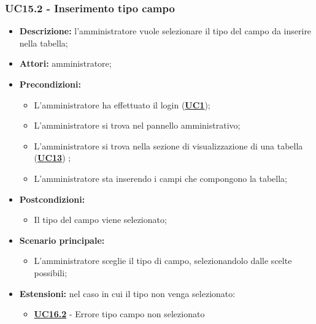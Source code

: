 \subsubsection{UC15.2 - Inserimento tipo campo}
\label{sec:UC15.2}
\begin{itemize}
	\item \textbf{Descrizione:} l’amministratore vuole selezionare il tipo del campo da inserire nella tabella;
	\item \textbf{Attori:} amministratore;
	\item \textbf{Precondizioni:} 
	\begin{itemize}
		\item L’amministratore ha effettuato il login (\hyperref[sec:UC1]{\textbf{UC1}});
		\item L’amministratore si trova nel pannello amministrativo;
		\item L’amministratore si trova nella sezione di visualizzazione di una tabella (\hyperref[sec:UC13]{\textbf{UC13}}) ;
		\item L’amministratore sta inserendo i campi che compongono la tabella;
	\end{itemize}
	\item \textbf{Postcondizioni:} 
	\begin{itemize}
		\item Il tipo del campo viene selezionato;
	\end{itemize}
	\item \textbf{Scenario principale:} 
	\begin{itemize}
		\item L’amministratore sceglie il tipo di campo, selezionandolo dalle scelte possibili;
	\end{itemize}
	\item \textbf{Estensioni:} nel caso in cui il tipo non venga selezionato:
	\begin{itemize}
		\item \hyperref[sec:UC16.2]{\textbf{UC16.2}} - Errore tipo campo non selezionato
	\end{itemize}
\end{itemize}

